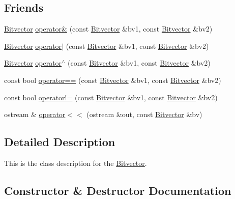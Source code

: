 \subsection*{Friends}
\begin{DoxyCompactItemize}
\item 
\hyperlink{classprism_1_1_bitvector}{Bitvector} \hyperlink{classprism_1_1_bitvector_aacc3670e298003822cf25f68fce7cbe0}{operator\&} (const \hyperlink{classprism_1_1_bitvector}{Bitvector} \&bv1, const \hyperlink{classprism_1_1_bitvector}{Bitvector} \&bv2)
\item 
\hyperlink{classprism_1_1_bitvector}{Bitvector} \hyperlink{classprism_1_1_bitvector_a7da9252d437ed366b78e5f728f20ab8d}{operator$\vert$} (const \hyperlink{classprism_1_1_bitvector}{Bitvector} \&bv1, const \hyperlink{classprism_1_1_bitvector}{Bitvector} \&bv2)
\item 
\hyperlink{classprism_1_1_bitvector}{Bitvector} \hyperlink{classprism_1_1_bitvector_a774fe42b1254399adc7b8c6646f7cab3}{operator$^\wedge$} (const \hyperlink{classprism_1_1_bitvector}{Bitvector} \&bv1, const \hyperlink{classprism_1_1_bitvector}{Bitvector} \&bv2)
\item 
const bool \hyperlink{classprism_1_1_bitvector_ab73504943fa9f2b6d0bbaef200ba4088}{operator==} (const \hyperlink{classprism_1_1_bitvector}{Bitvector} \&bv1, const \hyperlink{classprism_1_1_bitvector}{Bitvector} \&bv2)
\item 
const bool \hyperlink{classprism_1_1_bitvector_a085f70a7612a9fc1dd410533d09fa6fc}{operator!=} (const \hyperlink{classprism_1_1_bitvector}{Bitvector} \&bv1, const \hyperlink{classprism_1_1_bitvector}{Bitvector} \&bv2)
\item 
ostream \& \hyperlink{classprism_1_1_bitvector_ad319cf0952bce359ff96064b3a416236}{operator$<$$<$} (ostream \&out, const \hyperlink{classprism_1_1_bitvector}{Bitvector} \&bv)
\end{DoxyCompactItemize}


\subsection{Detailed Description}
This is the class description for the \hyperlink{classprism_1_1_bitvector}{Bitvector}. 

\subsection{Constructor \& Destructor Documentation}
